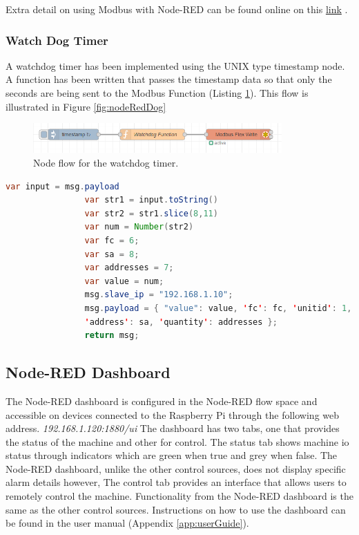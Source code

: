             
            Extra detail on using Modbus with Node-RED can be found online on this \href{https://stevesnoderedguide.com/node-red-modbus}{link} \cite{modbusNodeRed}.
            
        \subsubsection{Watch Dog Timer}
            A watchdog timer has been implemented using the UNIX type timestamp node. A function has been written that passes the timestamp data so that only the seconds are being sent to the Modbus Function (Listing \ref{fig:nodeRedWatchDogFlow}). This flow is illustrated in Figure \ref{fig:nodeRedDog}

            \begin{figure}[H]
                    \centering
                    \includegraphics[width = 0.85\textwidth]{2_images/nodeRedWatchDogFlow}
                    \caption{Node flow for the watchdog timer.}
                    \label{fig:nodeRedWatchDogFlow}
            \end{figure}  


            \begin{lstlisting}[language=Java, caption=Watchdog timer script, label=list:watchDog]
                var input = msg.payload
                var str1 = input.toString()
                var str2 = str1.slice(8,11)
                var num = Number(str2)
                var fc = 6;
                var sa = 8;
                var addresses = 7;
                var value = num;
                msg.slave_ip = "192.168.1.10";
                msg.payload = { "value": value, 'fc': fc, 'unitid': 1, 
                'address': sa, 'quantity': addresses };
                return msg;
            \end{lstlisting}            

    \subsection{Node-RED Dashboard}
        The Node-RED dashboard is configured in the Node-RED flow space and accessible on devices connected to the Raspberry Pi through the following web address. \newline \textit{192.168.1.120:1880/ui} \newline The dashboard has two tabs, one that provides the status of the machine and other for control. The status tab shows machine \acrshort{io} status through indicators which are green when true and grey when false. The Node-RED dashboard, unlike the other control sources, does not display specific alarm details however, 
        The control tab provides an interface that allows users to remotely control the machine. Functionality from the Node-RED dashboard is the same as the other control sources. Instructions on how to use the dashboard can be found in the user manual (Appendix \ref{app:userGuide}).

